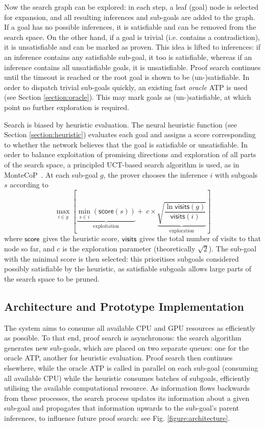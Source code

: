 \documentclass{llncs}
\begin{document}
Now the search graph can be explored: in each step, a leaf (goal) node is selected for expansion, and all resulting inferences and sub-goals are added to the graph.
If a goal has no possible inferences, it is satisfiable and can be removed from the search space.
On the other hand, if a goal is trivial (i.e. contains a contradiction), it is unsatisfiable and can be marked as proven.
This idea is lifted to inferences: if an inference contains any satisfiable sub-goal, it too is satisfiable, whereas if an inference contains all unsatisfiable goals, it is unsatisfiable.
Proof search continues until the timeout is reached or the root goal is shown to be (un-)satisfiable.
In order to dispatch trivial sub-goals quickly, an existing fast \emph{oracle} ATP is used (see Section \ref{section:oracle}).
This may mark goals as (un-)satisfiable, at which point no further exploration is required.

Search is biased by heuristic evaluation.
The neural heuristic function (see Section \ref{section:heuristic}) evaluates each goal and assigns a score corresponding to whether the network believes that the goal is satisfiable or unsatisfiable.
In order to balance exploitation of promising directions and exploration of all parts of the search space, a principled UCT-based search algorithm is used, as in MonteCoP~\cite{MonteCoP}.
At each sub-goal $g$, the prover chooses the inference \(i\) with subgoals \(s\) according to
\[
	\max_{i \in g}\left[
		\underbrace{\min_{s \in i}\left(\textsf{score}(s)\right)}_\text{exploitation} +~
		c \times \underbrace{\sqrt{\frac{\ln\textsf{visits}\left(g\right)}{\textsf{visits}\left(i\right)}}}_\text{exploration}
	\right]
\]
where ${\sf score}$ gives the heuristic score, ${\sf visits}$ gives the total number of visits to that node so far, and \(c\) is the exploration parameter (theoretically \(\sqrt{2}\)).
The sub-goal with the minimal score is then selected: this prioritises subgoals considered possibly satisfiable by the heuristic, as satisfiable subgoals allows large parts of the search space to be pruned.

\subsection{Architecture and Prototype Implementation}
The system aims to consume all available CPU and GPU resources as efficiently as possible.
To that end, proof search is asynchronous: the search algorithm generates new sub-goals, which are placed on two separate queues: one for the oracle ATP, another for heuristic evaluation.
Proof search then continues elsewhere, while the oracle ATP is called in parallel on each sub-goal (consuming all available CPU) while the heuristic consumes batches of subgoals, efficiently utilising the available computational resource.
As information flows backwards from these processes, the search process updates its information about a given sub-goal and propagates that information upwards to the sub-goal's parent inferences, to influence future proof search: see Fig. \ref{figure:architecture}.
\end{document}
